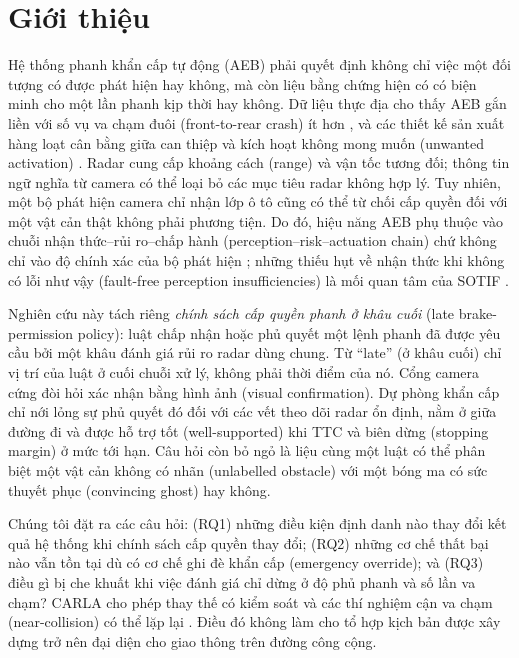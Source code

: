 \documentclass[conference]{IEEEtran}
\begin{document}
\section{Giới thiệu}
Hệ thống phanh khẩn cấp tự động (AEB) phải quyết định không chỉ việc một đối
tượng có được phát hiện hay không, mà còn liệu bằng chứng hiện có có biện minh
cho một lần phanh kịp thời hay không. Dữ liệu thực địa cho thấy AEB gắn liền
với số vụ va chạm đuôi (front-to-rear crash) ít hơn
\cite{cicchino2017effectiveness}, và các thiết kế sản xuất hàng loạt cân bằng
giữa can thiệp và kích hoạt không mong muốn (unwanted activation)
\cite{coelingh2010collision}. Radar cung cấp khoảng cách (range) và vận tốc
tương đối; thông tin ngữ nghĩa từ camera có thể loại bỏ các mục tiêu radar
không hợp lý. Tuy nhiên, một bộ phát hiện camera chỉ nhận lớp ô tô cũng có thể
từ chối cấp quyền đối với một vật cản thật không phải phương tiện. Do đó, hiệu
năng AEB phụ thuộc vào chuỗi nhận thức--rủi ro--chấp hành
(perception--risk--actuation chain) chứ không chỉ vào độ chính xác của bộ phát
hiện \cite{yang2022aebreview}; những thiếu hụt về nhận thức khi không có lỗi
như vậy (fault-free perception insufficiencies) là mối quan tâm của SOTIF
\cite{iso21448}.

Nghiên cứu này tách riêng \emph{chính sách cấp quyền phanh ở khâu cuối} (late
brake-permission policy): luật chấp nhận hoặc phủ quyết một lệnh phanh đã được
yêu cầu bởi một khâu đánh giá rủi ro radar dùng chung. Từ ``late'' (ở khâu
cuối) chỉ vị trí của luật ở cuối chuỗi xử lý, không phải thời điểm của nó. Cổng camera cứng đòi hỏi xác
nhận bằng hình ảnh (visual confirmation). Dự phòng khẩn cấp chỉ nới lỏng sự
phủ quyết đó đối với các vết theo dõi radar ổn định, nằm ở giữa đường đi và
được hỗ trợ tốt (well-supported) khi TTC và biên dừng (stopping margin) ở mức
tới hạn. Câu hỏi còn bỏ ngỏ là liệu cùng một luật
có thể phân biệt một vật cản không có nhãn (unlabelled obstacle) với một bóng
ma có sức thuyết phục (convincing ghost) hay không.

Chúng tôi đặt ra các câu hỏi: (RQ1) những điều kiện định danh nào thay đổi kết
quả hệ thống khi chính sách cấp quyền thay đổi; (RQ2) những cơ chế thất bại
nào vẫn tồn tại dù có cơ chế ghi đè khẩn cấp (emergency override); và (RQ3)
điều gì bị che khuất khi việc đánh giá chỉ dừng ở độ phủ phanh và số lần va
chạm? CARLA cho phép thay thế có kiểm soát và các thí nghiệm cận va chạm
(near-collision) có thể lặp lại \cite{dosovitskiy2017carla,kang2019testing}.
Điều đó không làm cho tổ hợp kịch bản được xây dựng trở nên đại diện cho giao
thông trên đường công cộng.
\end{document}
